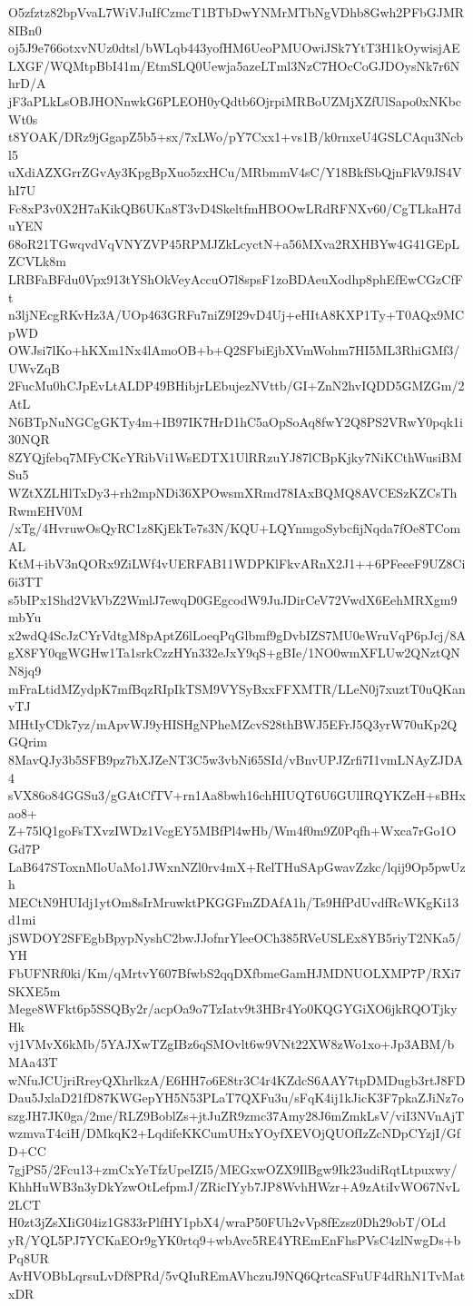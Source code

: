 O5zfztz82bpVvaL7WiVJuIfCzmcT1BTbDwYNMrMTbNgVDhb8Gwh2PFbGJMR8IBn0
oj5J9e766otxvNUz0dtsl/bWLqb443yofHM6UeoPMUOwiJSk7YtT3H1kOywisjAE
LXGF/WQMtpBbI41m/EtmSLQ0Uewja5azeLTml3NzC7HOcCoGJDOysNk7r6NhrD/A
jF3aPLkLsOBJHONnwkG6PLEOH0yQdtb6OjrpiMRBoUZMjXZfUlSapo0xNKbcWt0s
t8YOAK/DRz9jGgapZ5b5+sx/7xLWo/pY7Cxx1+vs1B/k0rnxeU4GSLCAqu3Ncbl5
uXdiAZXGrrZGvAy3KpgBpXuo5zxHCu/MRbmmV4sC/Y18BkfSbQjnFkV9JS4VhI7U
Fc8xP3v0X2H7aKikQB6UKa8T3vD4SkeltfmHBOOwLRdRFNXv60/CgTLkaH7duYEN
68oR21TGwqvdVqVNYZVP45RPMJZkLcyctN+a56MXva2RXHBYw4G41GEpLZCVLk8m
LRBFaBFdu0Vpx913tYShOkVeyAccuO7l8spsF1zoBDAeuXodhp8phEfEwCGzCfFt
n3ljNEcgRKvHz3A/UOp463GRFu7niZ9I29vD4Uj+eHItA8KXP1Ty+T0AQx9MCpWD
OWJsi7lKo+hKXm1Nx4lAmoOB+b+Q2SFbiEjbXVmWohm7HI5ML3RhiGMf3/UWvZqB
2FucMu0hCJpEvLtALDP49BHibjrLEbujezNVttb/GI+ZnN2hvIQDD5GMZGm/2AtL
N6BTpNuNGCgGKTy4m+IB97IK7HrD1hC5aOpSoAq8fwY2Q8PS2VRwY0pqk1i30NQR
8ZYQjfebq7MFyCKcYRibVi1WsEDTX1UlRRzuYJ87lCBpKjky7NiKCthWusiBMSu5
WZtXZLHlTxDy3+rh2mpNDi36XPOwsmXRmd78IAxBQMQ8AVCESzKZCsThRwmEHV0M
/xTg/4HvruwOsQyRC1z8KjEkTe7s3N/KQU+LQYnmgoSybcfijNqda7fOe8TComAL
KtM+ibV3nQORx9ZiLWf4vUERFAB11WDPKlFkvARnX2J1++6PFeeeF9UZ8Ci6i3TT
s5bIPx1Shd2VkVbZ2WmlJ7ewqD0GEgcodW9JuJDirCeV72VwdX6EehMRXgm9mbYu
x2wdQ4ScJzCYrVdtgM8pAptZ6lLoeqPqGlbmf9gDvbIZS7MU0eWruVqP6pJcj/8A
gX8FY0qgWGHw1Ta1srkCzzHYn332eJxY9qS+gBIe/1NO0wmXFLUw2QNztQNN8jq9
mFraLtidMZydpK7mfBqzRIpIkTSM9VYSyBxxFFXMTR/LLeN0j7xuztT0uQKanvTJ
MHtIyCDk7yz/mApvWJ9yHISHgNPheMZcvS28thBWJ5EFrJ5Q3yrW70uKp2QGQrim
8MavQJy3b5SFB9pz7bXJZeNT3C5w3vbNi65SId/vBnvUPJZrfi7I1vmLNAyZJDA4
sVX86o84GGSu3/gGAtCfTV+rn1Aa8bwh16chHIUQT6U6GUlIRQYKZeH+sBHxao8+
Z+75lQ1goFsTXvzIWDz1VcgEY5MBfPl4wHb/Wm4f0m9Z0Pqfh+Wxca7rGo1OGd7P
LaB647SToxnMloUaMo1JWxnNZl0rv4mX+RelTHuSApGwavZzkc/lqij9Op5pwUzh
MECtN9HUIdj1ytOm8sIrMruwktPKGGFmZDAfA1h/Ts9HfPdUvdfRcWKgKi13d1mi
jSWDOY2SFEgbBpypNyshC2bwJJofnrYleeOCh385RVeUSLEx8YB5riyT2NKa5/YH
FbUFNRf0ki/Km/qMrtvY607BfwbS2qqDXfbmeGamHJMDNUOLXMP7P/RXi7SKXE5m
Mege8WFkt6p5SSQBy2r/acpOa9o7TzIatv9t3HBr4Yo0KQGYGiXO6jkRQOTjkyHk
vj1VMvX6kMb/5YAJXwTZgIBz6qSMOvlt6w9VNt22XW8zWo1xo+Jp3ABM/bMAa43T
wNfuJCUjriRreyQXhrlkzA/E6HH7o6E8tr3C4r4KZdcS6AAY7tpDMDugb3rtJ8FD
Dau5JxlaD21fD87KWGepYH5N53PLaT7QXFu3u/sFqK4ij1kJicK3F7pkaZJiNz7o
szgJH7JK0ga/2me/RLZ9BoblZs+jtJuZR9zmc37Amy28J6mZmkLsV/viI3NVnAjT
wzmvaT4ciH/DMkqK2+LqdifeKKCumUHxYOyfXEVOjQUOfIzZcNDpCYzjI/GfD+CC
7gjPS5/2Fcu13+zmCxYeTfzUpeIZI5/MEGxwOZX9IlBgw9Ik23udiRqtLtpuxwy/
KhhHuWB3n3yDkYzwOtLefpmJ/ZRicIYyb7JP8WvhHWzr+A9zAtiIvWO67NvL2LCT
H0zt3jZsXIiG04iz1G833rPlfHY1pbX4/wraP50FUh2vVp8fEzsz0Dh29obT/OLd
yR/YQL5PJ7YCKaEOr9gYK0rtq9+wbAvc5RE4YREmEnFhsPVsC4zlNwgDs+bPq8UR
AvHVOBbLqrsuLvDf8PRd/5vQIuREmAVhczuJ9NQ6QrtcaSFuUF4dRhN1TvMatxDR
